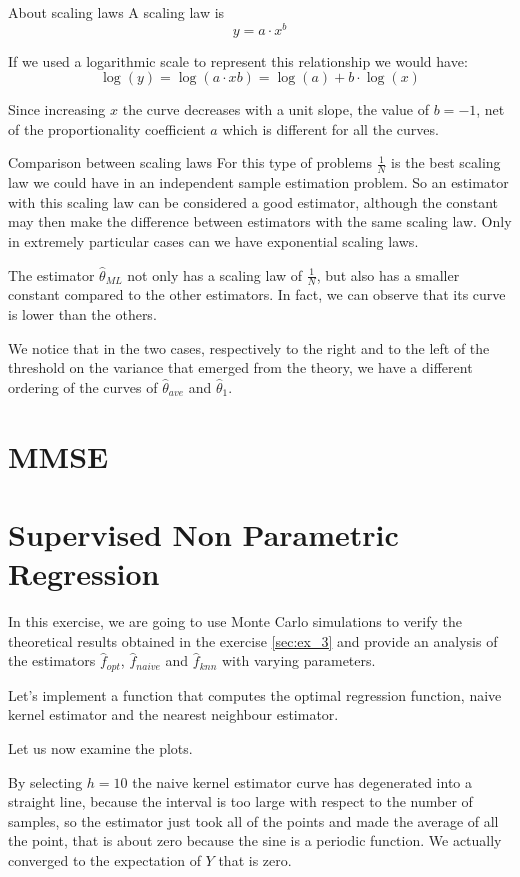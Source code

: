 \begin{note}{About scaling laws}
A scaling law is 
$$
y=a\cdot x^b
$$

If we used a logarithmic scale to represent this relationship we would have:
$$
\log(y)=\log(a\cdot xb)=\log(a)+b\cdot\log(x)
$$

Since increasing $x$ the curve decreases with a unit slope, the value of $b=-1$, net of the proportionality coefficient $a$ which is different for all the curves.
\end{note}
\begin{note}{Comparison between scaling laws}
For this type of problems $\frac 1N$ is the best scaling law we could have in an independent sample estimation problem. So an estimator with this scaling law can be considered a good estimator, although the constant may then make the difference between estimators with the same scaling law.  
Only in extremely particular cases can we have exponential scaling laws.
\end{note}

The estimator $\hat\theta_{ML}$ not only has a scaling law of $\frac 1N$, but also has a smaller constant compared to the other estimators. In fact, we can observe that its curve is lower than the others.

We notice that in the two cases, respectively to the right and to the left of the threshold on the variance that emerged from the theory, we have a different ordering of the curves of $\hat\theta_{ave}$ and $\hat \theta_1$.


\section{MMSE}
\section{Supervised Non Parametric Regression}
In this exercise, we are going to use Monte Carlo simulations to verify the theoretical results obtained in the exercise \ref{sec:ex_3} and provide an analysis of the estimators $\hat f_{opt}$, $\hat f_{naive}$ and $\hat f_{knn}$ with varying parameters.

Let's implement a function that computes the optimal regression function, naive kernel estimator and the nearest neighbour estimator.

Let us now examine the plots.

By selecting $h = 10$ the naive kernel estimator curve has degenerated into a straight line, because the interval is too large with respect to the number of samples, so the estimator just took all of the points and made the average of all the point, that is about zero because the sine is a periodic function. We actually converged to the expectation of $Y$ that is zero.

